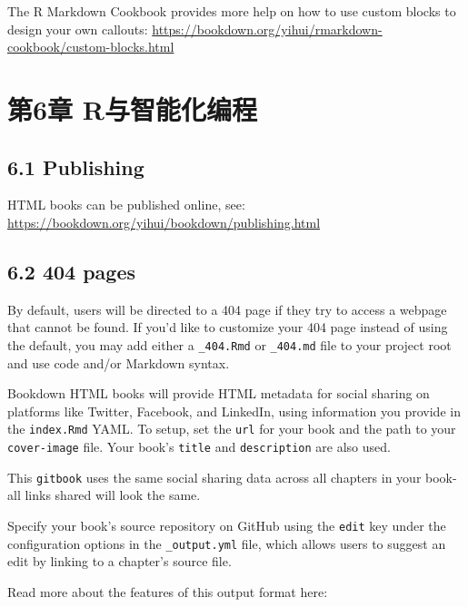 \documentclass[
]{book}
\theoremstyle{definition}
\theoremstyle{definition}
\theoremstyle{definition}
\theoremstyle{definition}
\theoremstyle{remark}
\begin{document}
The R Markdown Cookbook provides more help on how to use custom blocks to design your own callouts: \url{https://bookdown.org/yihui/rmarkdown-cookbook/custom-blocks.html}

\hypertarget{ux7b2c6ux7ae0-rux4e0eux667aux80fdux5316ux7f16ux7a0b}{%
\chapter*{第6章 R与智能化编程}\label{ux7b2c6ux7ae0-rux4e0eux667aux80fdux5316ux7f16ux7a0b}}

\hypertarget{publishing}{%
\section*{6.1 Publishing}\label{publishing}}

HTML books can be published online, see: \url{https://bookdown.org/yihui/bookdown/publishing.html}

\hypertarget{pages}{%
\section*{6.2 404 pages}\label{pages}}

By default, users will be directed to a 404 page if they try to access a webpage that cannot be found. If you'd like to customize your 404 page instead of using the default, you may add either a \texttt{\_404.Rmd} or \texttt{\_404.md} file to your project root and use code and/or Markdown syntax.

Bookdown HTML books will provide HTML metadata for social sharing on platforms like Twitter, Facebook, and LinkedIn, using information you provide in the \texttt{index.Rmd} YAML. To setup, set the \texttt{url} for your book and the path to your \texttt{cover-image} file. Your book's \texttt{title} and \texttt{description} are also used.

This \texttt{gitbook} uses the same social sharing data across all chapters in your book- all links shared will look the same.

Specify your book's source repository on GitHub using the \texttt{edit} key under the configuration options in the \texttt{\_output.yml} file, which allows users to suggest an edit by linking to a chapter's source file.

Read more about the features of this output format here:
\end{document}

